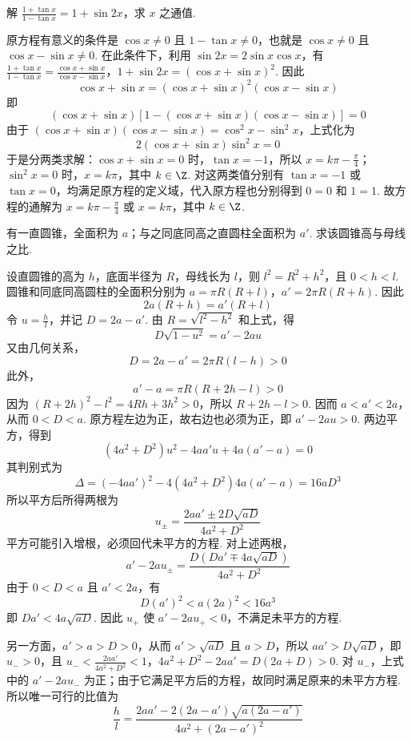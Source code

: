 \documentclass[UTF8,a4paper,oneside,11pt]{ctexbook}
\begin{document}
\begin{problem}
解 \(\frac{1+\tan x}{1-\tan x}=1+\sin 2x\)，求 \(x\) 之通值.
\end{problem}

\begin{solution}
原方程有意义的条件是 \(\cos x\ne0\) 且 \(1-\tan x\ne0\)，也就是 \(\cos x\ne0\) 且 \(\cos x-\sin x\ne0\). 在此条件下，利用 \(\sin 2x=2\sin x\cos x\)，有
\(\frac{1+\tan x}{1-\tan x}=\frac{\cos x+\sin x}{\cos x-\sin x}\)，\(1+\sin 2x=\left(\cos x+\sin x\right)^{2}\).
因此
\[
\cos x+\sin x=\left(\cos x+\sin x\right)^{2}\left(\cos x-\sin x\right)
\]
即
\[
\left(\cos x+\sin x\right)\left[1-\left(\cos x+\sin x\right)\left(\cos x-\sin x\right)\right]=0
\]
由于 \(\left(\cos x+\sin x\right)\left(\cos x-\sin x\right)=\cos^{2}x-\sin^{2}x\)，上式化为
\[
2\left(\cos x+\sin x\right)\sin^{2}x=0
\]
于是分两类求解：\(\cos x+\sin x=0\) 时，\(\tan x=-1\)，所以 \(x=k\pi-\frac{\pi}{4}\)；\(\sin^{2}x=0\) 时，\(x=k\pi\)，其中 \(k\in\Z\). 对这两类值分别有 \(\tan x=-1\) 或 \(\tan x=0\)，均满足原方程的定义域，代入原方程也分别得到 \(0=0\) 和 \(1=1\). 故方程的通解为 \(x=k\pi-\frac{\pi}{4}\) 或 \(x=k\pi\)，其中 \(k\in\Z\).
\end{solution}

\begin{problem}
有一直圆锥，全面积为 \(a\)；与之同底同高之直圆柱全面积为 \(a'\). 求该圆锥高与母线之比.
\end{problem}

\begin{solution}
设直圆锥的高为 \(h\)，底面半径为 \(R\)，母线长为 \(l\)，则 \(l^{2}=R^{2}+h^{2}\)，且 \(0<h<l\). 圆锥和同底同高圆柱的全面积分别为
\(a=\pi R\left(R+l\right)\)，\(a'=2\pi R\left(R+h\right)\).
因此
\[
2a\left(R+h\right)=a'\left(R+l\right)
\]
令 \(u=\frac{h}{l}\)，并记 \(D=2a-a'\). 由 \(R=\sqrt{l^{2}-h^{2}}\) 和上式，得
\[
D\sqrt{1-u^{2}}=a'-2au
\]
又由几何关系，
\[
D=2a-a'=2\pi R(l-h)>0
\]
此外，
\[
a'-a=\pi R\left(R+2h-l\right)>0
\]
因为 \((R+2h)^{2}-l^{2}=4Rh+3h^{2}>0\)，所以 \(R+2h-l>0\). 因而 \(a<a'<2a\)，从而 \(0<D<a\). 原方程左边为正，故右边也必须为正，即 \(a'-2au>0\). 两边平方，得到
\[
\left(4a^{2}+D^{2}\right)u^{2}-4aa'u+4a\left(a'-a\right)=0
\]
其判别式为
\[
\Delta=\left(-4aa'\right)^{2}-4\left(4a^{2}+D^{2}\right)4a\left(a'-a\right)=16aD^{3}
\]
所以平方后所得两根为
\[
u_{\pm}=\frac{2aa'\pm2D\sqrt{aD}}{4a^{2}+D^{2}}
\]
平方可能引入增根，必须回代未平方的方程. 对上述两根，
\[
a'-2au_{\pm}=\frac{D\left(Da'\mp4a\sqrt{aD}\right)}{4a^{2}+D^{2}}
\]
由于 \(0<D<a\) 且 \(a'<2a\)，有
\[
D(a')^{2}<a(2a)^{2}<16a^{3}
\]
即 \(Da'<4a\sqrt{aD}\). 因此 \(u_{+}\) 使 \(a'-2au_{+}<0\)，不满足未平方的方程.

另一方面，\(a'>a>D>0\)，从而 \(a'>\sqrt{aD}\) 且 \(a>D\)，所以 \(aa'>D\sqrt{aD}\)，即 \(u_{-}>0\)，且
\(u_{-}<\frac{2aa'}{4a^{2}+D^{2}}<1\)，\(4a^{2}+D^{2}-2aa'=D(2a+D)>0\).
对 \(u_{-}\)，上式中的 \(a'-2au_{-}\) 为正；由于它满足平方后的方程，故同时满足原来的未平方方程. 所以唯一可行的比值为
\[
\boxed{\frac{h}{l}=\frac{2aa'-2\left(2a-a'\right)\sqrt{a\left(2a-a'\right)}}{4a^{2}+\left(2a-a'\right)^{2}}}
\]
\end{solution}

\end{document}
